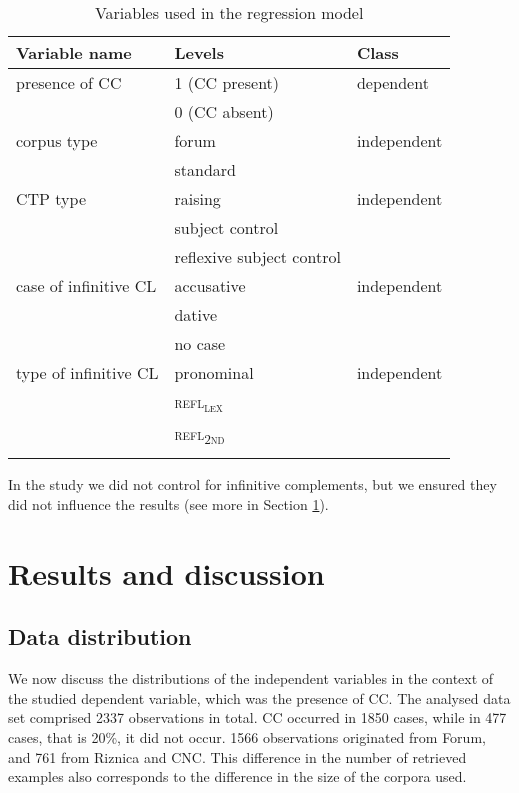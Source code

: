 \begin{table}
\caption{Variables used in the regression model\label{T15.1}}
\begin{tabular}{lll}
\lsptoprule
Variable name & Levels & Class \\
\midrule
presence of CC & 1 (CC present) & dependent \\
 & 0 (CC absent) & \\
 \tablevspace
corpus type & forum & independent \\
 & standard & \\
 \tablevspace
CTP type & raising & independent \\
 & subject control & \\
 & reflexive subject control & \\
 \tablevspace
case of infinitive CL & accusative & independent\\
 & dative & \\
 & no case & \\
 \tablevspace
type of infinitive CL & pronominal & independent \\ 
 & \textsc{refl\textsubscript{lex}} & \\
 & \textsc{refl\textsubscript{2nd}} & \\
\lspbottomrule
\end{tabular}
\end{table}

In the study we did not control for infinitive complements, but we ensured they did not influence the results (see more in Section \ref{Results and discussion}).

\section{Results and discussion}
\label{Results and discussion}
\subsection{Data distribution}

We now discuss the distributions of the independent variables in the context of the studied dependent variable, which was the presence of CC. The analysed data set comprised 2337 observations in total. CC occurred in 1850 cases, while in 477 cases, that is 20\%, it did not occur. 1566 observations originated from Forum, and 761 from Riznica and CNC. This difference in the number of retrieved examples also corresponds to the difference in the size of the corpora used. 

